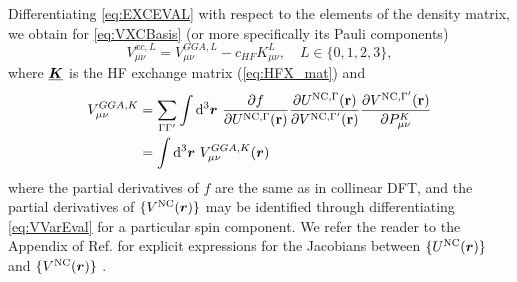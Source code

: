 Differentiating \cref{eq:EXCEVAL} with respect to the elements of the density matrix, we obtain for \cref{eq:VXCBasis} 
(or more specifically its Pauli components)
\begin{equation}
  V^{xc,L}_{\mu\nu} = V^{GGA,L}_{\mu\nu} - c_{HF} K^L_{\mu\nu},\quad L \in \{0,1,2,3\},
\end{equation}
where $\boldsymbol{\underline{K}}$ is the HF exchange matrix (\cref{eq:HFX_mat}) and
\begin{align}
  \label{eq:VXCGGA_eval}
V^{GGA,K}_{\mu\nu} &= \sum_{\Gamma \Gamma'} \int \mathrm{d}^3 \boldsymbol{r} \text{  }
  \frac{\partial f }{\partial U^{\mathrm{NC},\Gamma}(\mathbf{r})}
  \frac{\partial U^{\mathrm{NC},\Gamma}(\mathbf{r})}{\partial V^{\mathrm{NC},\Gamma'}(\mathbf{r})}
  \frac{\partial V^{\mathrm{NC},\Gamma'}(\mathbf{r})}{\partial P^{K}_{\mu\nu}} \\ &= \nonumber \int \mathrm{d}^3 \boldsymbol{r} \text{  } V^{GGA,K}_{\mu\nu}(\boldsymbol{r})
\end{align}  
where the partial derivatives of $f$ are the same as in collinear DFT, and the partial derivatives of $\{V^{\mathrm{NC}}(\boldsymbol{r})\}$ may be
identified through differentiating \cref{eq:VVarEval} for a particular spin component. We refer the reader to the Appendix
of Ref.\cite{Li17_2591} for explicit expressions for the Jacobians between $\{U^{\mathrm{NC}}(\boldsymbol{r})\}$ and $\{V^{\mathrm{NC}}(\boldsymbol{r})\}$ .

